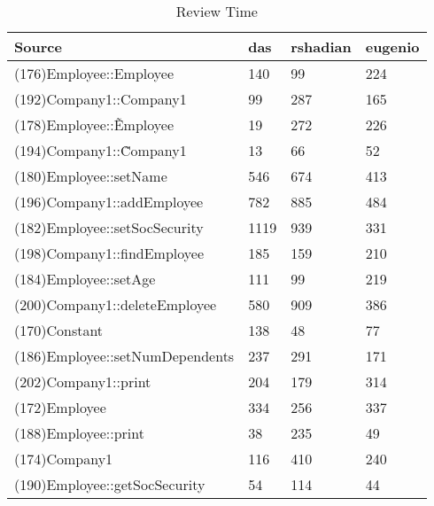 \begin{table}[hb]
\begin{center}
\begin{tabular}{|l|l|l|l|}
\hline
Source & das & rshadian & eugenio\\
\hline
(176)Employee::Employee & 140 & 99 & 224\\
(192)Company1::Company1 & 99 & 287 & 165\\
(178)Employee::\~Employee & 19 & 272 & 226\\
(194)Company1::\~Company1 & 13 & 66 & 52\\
(180)Employee::setName & 546 & 674 & 413\\
(196)Company1::addEmployee & 782 & 885 & 484\\
(182)Employee::setSocSecurity & 1119 & 939 & 331\\
(198)Company1::findEmployee & 185 & 159 & 210\\
(184)Employee::setAge & 111 & 99 & 219\\
(200)Company1::deleteEmployee & 580 & 909 & 386\\
(170)Constant & 138 & 48 & 77\\
(186)Employee::setNumDependents & 237 & 291 & 171\\
(202)Company1::print & 204 & 179 & 314\\
(172)Employee & 334 & 256 & 337\\
(188)Employee::print & 38 & 235 & 49\\
(174)Company1 & 116 & 410 & 240\\
(190)Employee::getSocSecurity & 54 & 114 & 44\\
\hline
\end{tabular}
\end{center}
\caption{Review Time}
\end{table}


